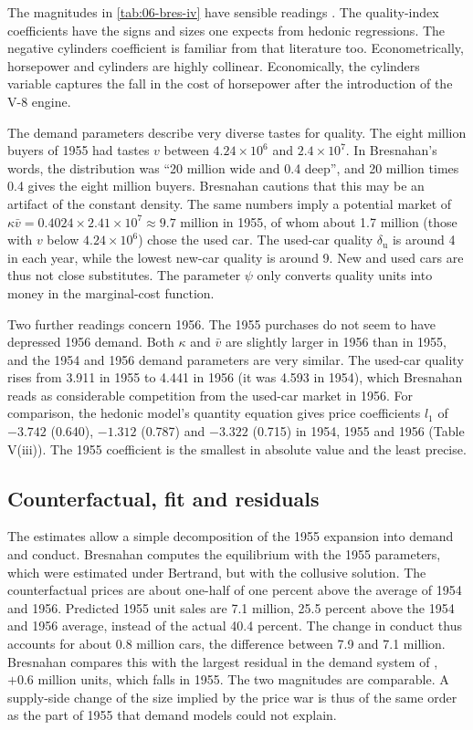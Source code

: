 The magnitudes in \cref{tab:06-bres-iv} have sensible readings \citep[p.~475]{Bresnahan1987}. The quality-index
coefficients have the signs and sizes one expects from hedonic regressions. The negative cylinders coefficient is
familiar from that literature too. Econometrically, horsepower and cylinders are highly collinear. Economically,
the cylinders variable captures the fall in the cost of horsepower after the introduction of the V-8 engine.

The demand parameters describe very diverse tastes for quality. The eight million buyers of 1955 had tastes $v$
between $4.24\times10^{6}$ and $2.4\times10^{7}$. In Bresnahan's words, the distribution was ``20 million wide and 0.4
deep'', and 20 million times 0.4 gives the eight million buyers. Bresnahan cautions that this may be an artifact of
the constant density. The same numbers imply a potential market of $\kappa\bar v = 0.4024\times 2.41\times10^{7}
\approx 9.7$ million in 1955, of whom about 1.7 million (those with $v$ below $4.24\times10^{6}$) chose the used
car. The used-car quality $\delta_{\mathrm u}$ is around 4 in each year, while the lowest new-car quality is around
9. New and used cars are thus not close substitutes. The parameter $\psi$ only converts quality units into money in
the marginal-cost function.

Two further readings concern 1956. The 1955 purchases do not seem to have depressed 1956 demand. Both $\kappa$ and $\bar v$
are slightly larger in 1956 than in 1955, and the 1954 and 1956 demand parameters are very similar. The used-car
quality rises from 3.911 in 1955 to 4.441 in 1956 (it was 4.593 in 1954), which Bresnahan reads as considerable competition from the used-car
market in 1956. For comparison, the hedonic model's quantity equation gives price coefficients $l_1$ of $-3.742$
(0.640), $-1.312$ (0.787) and $-3.322$ (0.715) in 1954, 1955 and 1956 (Table V(iii)). The 1955 coefficient is the
smallest in absolute value and the least precise.

\subsection{Counterfactual, fit and residuals}\label{sec:06-bres-fit}

The estimates allow a simple decomposition of the 1955 expansion into demand and conduct. Bresnahan computes the
equilibrium with the 1955 parameters, which were estimated under Bertrand, but with the collusive solution. The
counterfactual prices are about one-half of one percent above the average of 1954 and 1956. Predicted 1955 unit
sales are 7.1 million, 25.5 percent above the 1954 and 1956 average, instead of the actual 40.4 percent. The change
in conduct thus accounts for about 0.8 million cars, the difference between 7.9 and 7.1 million. Bresnahan compares
this with the largest residual in the demand system of \citet{Chow1960}, $+0.6$ million units, which falls in 1955.
The two magnitudes are comparable. A supply-side change of the size implied by the price war is thus of the same
order as the part of 1955 that demand models could not explain.

